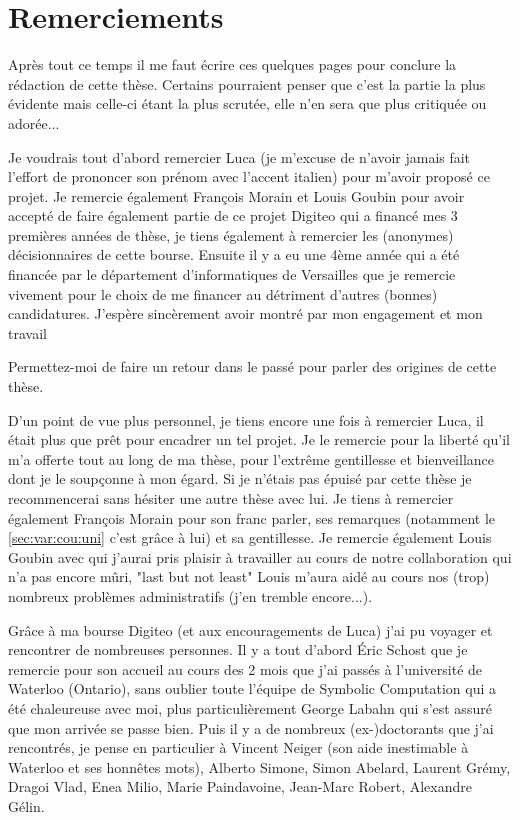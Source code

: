 \documentclass[10pt,a4paper]{book}
\theoremstyle{plain}
\theoremstyle{definition}
\theoremstyle{definition}
\theoremstyle{definition}
\theoremstyle{definition}
\theoremstyle{definition}
\theoremstyle{remark}
\theoremstyle{remark}
\theoremstyle{definition}
\begin{document}
\normalsize

\mainmatter
\maketitle
\chapter*{Remerciements}

Après tout ce temps il me faut écrire ces quelques pages pour conclure la 
rédaction de cette thèse. Certains pourraient penser que c'est la partie la 
plus évidente mais celle-ci étant la plus scrutée, elle n'en sera que plus 
critiquée ou adorée...

Je voudrais tout d'abord remercier Luca (je m'excuse de n'avoir jamais fait 
l'effort de prononcer son prénom avec l'accent italien) pour m'avoir proposé ce
projet. Je remercie également François Morain et Louis Goubin pour avoir 
accepté de faire également partie de ce projet Digiteo qui a financé mes 3 
premières années de thèse, je tiens également à remercier les (anonymes) 
décisionnaires de cette bourse. Ensuite il y a eu une 4ème année qui a été 
financée par le département d'informatiques de Versailles que je remercie 
vivement pour le choix de me financer au détriment d'autres (bonnes) 
candidatures. J'espère sincèrement avoir montré par mon engagement et mon 
travail

Permettez-moi de faire un retour dans le passé pour parler des origines de 
cette thèse. 

D'un point de vue plus personnel, je tiens encore une fois à remercier Luca, il
était plus que prêt pour encadrer un tel projet. Je le remercie pour la liberté
qu'il m'a offerte tout au long de ma thèse, pour l'extrême gentillesse et 
bienveillance dont je le soupçonne à mon égard. Si je n'étais pas épuisé par 
cette thèse je recommencerai sans hésiter une autre thèse avec lui. Je tiens à 
remercier également François Morain pour son franc parler, ses remarques 
(notamment le \ref{sec:var:cou:uni} c'est grâce à lui) et sa 
gentillesse. Je remercie également Louis Goubin avec qui j'aurai pris plaisir
à travailler au cours de notre collaboration qui n'a pas encore mûri, "last but
not least" Louis m'aura aidé au cours nos (trop) nombreux problèmes 
administratifs (j'en tremble encore...).

Grâce à ma bourse Digiteo (et aux encouragements de Luca) j'ai pu voyager et 
rencontrer de nombreuses personnes. Il y a tout d'abord \'Eric Schost que 
je remercie pour son accueil au cours des 2 mois que j'ai passés à l'université
de Waterloo (Ontario), sans oublier toute l'équipe de Symbolic Computation qui 
a été chaleureuse avec moi, plus particulièrement George Labahn qui s'est 
assuré que mon arrivée se passe bien. Puis il y a de nombreux (ex-)doctorants 
que j'ai rencontrés, je pense en particulier à Vincent Neiger (son aide 
inestimable à Waterloo et ses honnêtes mots), Alberto Simone,
Simon Abelard, Laurent Grémy, Dragoi Vlad, Enea Milio, Marie Paindavoine, 
Jean-Marc Robert, Alexandre Gélin.
\end{document}
